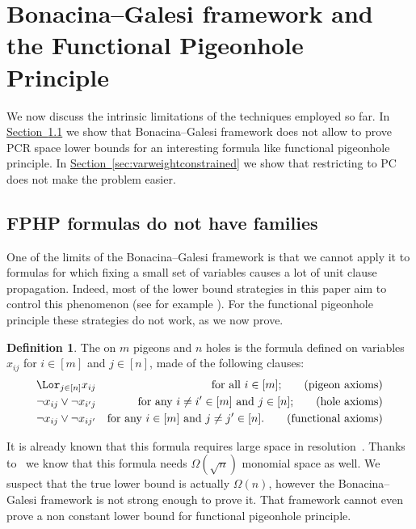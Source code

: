 \documentclass[11pt]{article}
\numberwithin{equation}{section}
\theoremstyle{definition}
\newtheorem{definition}[theorem]{Definition}
\theoremstyle{plain}
\newcommand{\expref}[2]{\hyperref[#2]{#1~\ref{#2}}}
\begin{document}
\section{Bonacina--Galesi framework and the Functional Pigeonhole Principle}
\label{sec:limitations}

  We now discuss the intrinsic limitations of the techniques employed
  so far. In \expref{Section}{sec:fphp-no-kextendible} we show that
  Bonacina--Galesi framework does not allow to prove PCR space lower
  bounds for an interesting formula like functional pigeonhole
  principle. In \expref{Section}{sec:varweightconstrained} we show that
  restricting to PC does not make the problem easier.

\subsection{FPHP formulas do not have \KextendibleNok families}
\label{sec:fphp-no-kextendible}

One of the limits of the Bonacina--Galesi framework is that we cannot
apply it to formulas for which fixing a small set of variables causes
a lot of unit clause propagation. Indeed, most of the lower bound
strategies in this paper aim to control this phenomenon (see for
example ). For the functional pigeonhole
principle these strategies do not work, as we now prove.


\begin{definition}\label{def:fphpformula}
  The  on $m$ pigeons and $n$ holes is the formula defined on variables $x_{ij}$ for $i\in[m]$ and $j\in[n]$, made of the following clauses:
  \begin{align}
    \Lor_{j\in[n]} x_{ij} && \text{for all $i\in[m]$;} \tag{pigeon axioms}\\
    \lnot{x_{ij}} \lor \lnot{x_{i'j}} && \text{for any
      $i\not=i'\in[m]$ and $j\in[n]$;} \tag{hole axioms}\\
    \lnot{x_{ij}} \lor \lnot{x_{ij'}} && \text{for any $i\in[m]$ and
      $j\not=j'\in[n]$.\tag{functional axioms}}
  \end{align}
\end{definition}

%

%
%
%
%
%

It is already known that this formula requires large space in
resolution~\cite{BW01ShortProofs,AD08CombinatoricalCharacterization}.
%
Thanks to~\cite{GKT19SpaceWidth} we know that this formula needs
$\Omega(\sqrt{n})$ monomial space as well.
%
We suspect that the true lower bound is actually $\Omega(n)$, however
the Bonacina--Galesi framework is not strong enough to prove it.
That framework cannot even prove a non constant lower bound for
functional pigeonhole principle.
\end{document}
